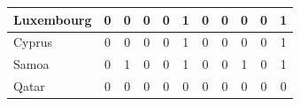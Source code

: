 \documentclass[12pt]{article}  %
\begin{document}
\begin{subappendices}
\begin{longtable}{|l|c|c|c|c|c|c|c|c|c|c|}
	\hline
	Luxembourg                                                     & 0                                                                      & 0                                                                      & 0                                                                      & 0                                                                      & 1                                                                      & 0                                                                      & 0                         & 0                           & 0                           & 1                           \\ 
	\hline
	Cyprus                                                         & 0                                                                      & 0                                                                      & 0                                                                      & 0                                                                      & 1                                                                      & 0                                                                      & 0                         & 0                           & 0                           & 1                           \\ 
	\hline
	Samoa                                                          & 0                                                                      & 1                                                                      & 0                                                                      & 0                                                                      & 1                                                                      & 0                                                                      & 0                         & 1                           & 0                           & 1                           \\ 
	\hline
	Qatar                                                          & 0                                                                      & 0                                                                      & 0                                                                      & 0                                                                      & 0                                                                      & 0                                                                      & 0                         & 0                           & 0                           & 0                           \\ 

\end{longtable}
\end{subappendices}
\end{document}
